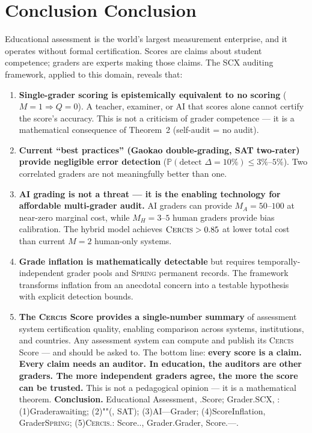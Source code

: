 \documentclass[11pt,a4paper]{article}
\theoremstyle{definition}
\theoremstyle{remark}
\newcommand{\SCX}{\textsc{SCX}}
\newcommand{\Cercis}{\textsc{Cercis}}
\newcommand{\Spring}{\textsc{Spring}}
\newcommand{\Pbb}{\mathbb{P}}
\begin{document}
\section{Conclusion Conclusion}
\label{sec:conclusion}
Educational assessment is the world's largest measurement enterprise, and it operates without formal certification. Scores are claims about student competence; graders are experts making those claims. The \SCX{} auditing framework, applied to this domain, reveals that:
\begin{enumerate}[label=(\roman*)]
    \item \textbf{Single-grader scoring is epistemically equivalent to no scoring} ($M=1 \Rightarrow Q=0$). A teacher, examiner, or AI that scores alone cannot certify the score's accuracy. This is not a criticism of grader competence — it is a mathematical consequence of Theorem~2 (self-audit = no audit).
    \item \textbf{Current ``best practices'' (Gaokao double-grading, SAT two-rater) provide negligible error detection} ($\Pbb(\text{detect } \Delta=10\%) \le 3\%$--$5\%$). Two correlated graders are not meaningfully better than one.
    \item \textbf{AI grading is not a threat — it is the enabling technology for affordable multi-grader audit.} AI graders can provide $M_A = 50$--$100$ at near-zero marginal cost, while $M_H = 3$--$5$ human graders provide bias calibration. The hybrid model achieves $\Cercis > 0.85$ at lower total cost than current $M=2$ human-only systems.
    \item \textbf{Grade inflation is mathematically detectable} but requires temporally-independent grader pools and \Spring{} permanent records. The framework transforms inflation from an anecdotal concern into a testable hypothesis with explicit detection bounds.
    \item \textbf{The \Cercis{} Score provides a single-number summary} of assessment system certification quality, enabling comparison across systems, institutions, and countries. Any assessment system can compute and publish its \Cercis{} Score — and should be asked to.
The bottom line: \textbf{every score is a claim. Every claim needs an auditor. In education, the auditors are other graders. The more independent graders agree, the more the score can be trusted.} This is not a pedagogical opinion — it is a mathematical theorem.
\medskip
\noindent\textbf{Conclusion.}
Educational Assessment, .Score; Grader.\SCX{}, : (1)Graderawaiting; (2)""(, SAT); (3)AI---Grader; (4)ScoreInflation, Grader\Spring{}; (5)\Cercis{}.: Score.., Grader.Grader, Score.---.

\end{enumerate}
\end{document}
